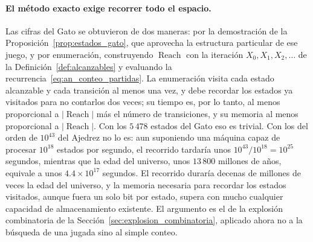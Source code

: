 \paragraph{El método exacto exige recorrer todo el espacio.} Las cifras del Gato se obtuvieron de dos maneras: por la demostración de la Proposición~\ref{prop:estados_gato}, que aprovecha la estructura particular de ese juego, y por enumeración, construyendo $\operatorname{Reach}$ con la iteración $X_0, X_1, X_2, \dots$ de la Definición~\ref{def:alcanzables} y evaluando la recurrencia~\eqref{eq:an_conteo_partidas}. La enumeración visita cada estado alcanzable y cada transición al menos una vez, y debe recordar los estados ya visitados para no contarlos dos veces; su tiempo es, por lo tanto, al menos proporcional a $|\operatorname{Reach}|$ más el número de transiciones, y su memoria al menos proporcional a $|\operatorname{Reach}|$. Con los $5\,478$ estados del Gato eso es trivial. Con los del orden de $10^{43}$ del Ajedrez no lo es: aun suponiendo una máquina capaz de procesar $10^{18}$ estados por segundo, el recorrido tardaría unos $10^{43} / 10^{18} = 10^{25}$ segundos, mientras que la edad del universo, unos $13\,800$ millones de años, equivale a unos $4.4 \times 10^{17}$ segundos. El recorrido duraría decenas de millones de veces la edad del universo, y la memoria necesaria para recordar los estados visitados, aunque fuera un solo bit por estado, supera con mucho cualquier capacidad de almacenamiento existente. El argumento es el de la explosión combinatoria de la Sección~\ref{sec:explosion_combinatoria}, aplicado ahora no a la búsqueda de una jugada sino al simple conteo.

